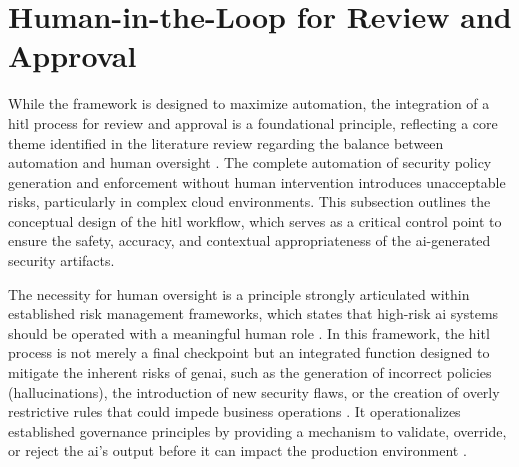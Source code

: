 

\section{Human-in-the-Loop for Review and Approval} %
\label{sub:Human-in-the-Loop for Review and Approval}

While the framework is designed to maximize automation, the integration of a \gls{hitl} process for review and approval is a foundational principle, reflecting a core theme identified in the literature review regarding the balance between automation and human oversight  \cite{nicosia_risk_nodate}. The complete automation of security policy generation and enforcement without human intervention introduces unacceptable risks, particularly in complex cloud environments. This subsection outlines the conceptual design of the \gls{hitl} workflow, which serves as a critical control point to ensure the safety, accuracy, and contextual appropriateness of the \gls{ai}-generated security artifacts.

The necessity for human oversight is a principle strongly articulated within established risk management frameworks, which states that high-risk \gls{ai} systems should be operated with a meaningful human role \cite{nicosia_risk_nodate}. In this framework, the \gls{hitl} process is not merely a final checkpoint but an integrated function designed to mitigate the inherent risks of \gls{genai}, such as the generation of incorrect policies (hallucinations), the introduction of new security flaws, or the creation of overly restrictive rules that could impede business operations  \cite{nicosia_risk_nodate}. It operationalizes established governance principles by providing a mechanism to validate, override, or reject the \gls{ai}'s output before it can impact the production environment \cite{noauthor_human---loop_nodate}.

